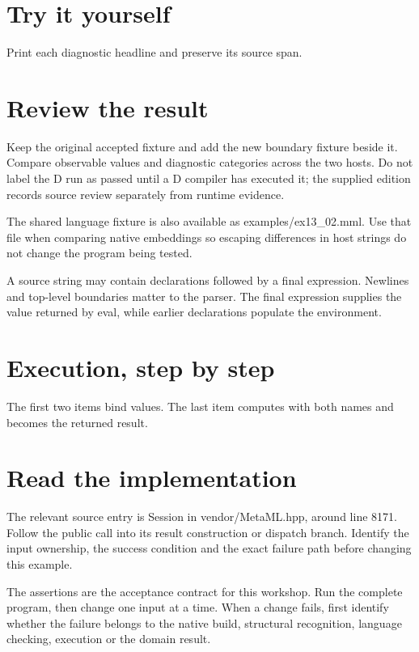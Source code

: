 \section*{Try it yourself}
Print each diagnostic headline and preserve its source span.

\section*{Review the result}
Keep the original accepted fixture and add the new boundary fixture beside it. Compare observable values and diagnostic categories across the two hosts. Do not label the D run as passed until a D compiler has executed it; the supplied edition records source review separately from runtime evidence.

The shared language fixture is also available as examples/ex13\_02.mml. Use that file when comparing native embeddings so escaping differences in host strings do not change the program being tested.

\clearpage
{}
A source string may contain declarations followed by a final expression. Newlines and top-level boundaries matter to the parser. The final expression supplies the value returned by eval, while earlier declarations populate the environment.


\section*{Execution, step by step}
The first two items bind values. The last item computes with both names and becomes the returned result.

\section*{Read the implementation}
The relevant source entry is Session in vendor/MetaML.hpp, around line 8171. Follow the public call into its result construction or dispatch branch. Identify the input ownership, the success condition and the exact failure path before changing this example.

The assertions are the acceptance contract for this workshop. Run the complete program, then change one input at a time. When a change fails, first identify whether the failure belongs to the native build, structural recognition, language checking, execution or the domain result.

